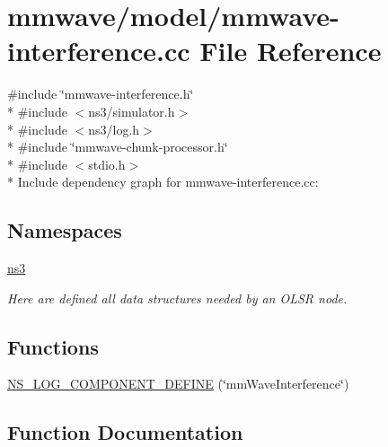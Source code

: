 \hypertarget{mmwave-interference_8cc}{}\section{mmwave/model/mmwave-\/interference.cc File Reference}
\label{mmwave-interference_8cc}
{\ttfamily \#include \char`\"{}mmwave-\/interference.\+h\char`\"{}}\\*
{\ttfamily \#include $<$ns3/simulator.\+h$>$}\\*
{\ttfamily \#include $<$ns3/log.\+h$>$}\\*
{\ttfamily \#include \char`\"{}mmwave-\/chunk-\/processor.\+h\char`\"{}}\\*
{\ttfamily \#include $<$stdio.\+h$>$}\\*
Include dependency graph for mmwave-\/interference.cc\+:
\subsection*{Namespaces}
\begin{DoxyCompactItemize}
\item 
 \hyperlink{namespacens3}{ns3}
\begin{DoxyCompactList}\small\item\em Here are defined all data structures needed by an O\+L\+SR node. \end{DoxyCompactList}\end{DoxyCompactItemize}
\subsection*{Functions}
\begin{DoxyCompactItemize}
\item 
\hyperlink{mmwave-interference_8cc_ade96babcdfd083276c56c12c1b9cef29}{N\+S\+\_\+\+L\+O\+G\+\_\+\+C\+O\+M\+P\+O\+N\+E\+N\+T\+\_\+\+D\+E\+F\+I\+NE} (\char`\"{}mm\+Wave\+Interference\char`\"{})
\end{DoxyCompactItemize}


\subsection{Function Documentation}
